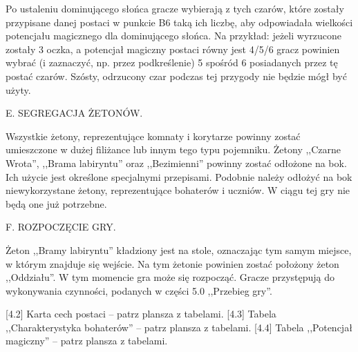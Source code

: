 Po ustaleniu dominującego słońca gracze wybierają z tych czarów, które zostały przypisane danej postaci w punkcie B6 taką ich liczbę, aby odpowiadała wielkości potencjału magicznego dla dominującego słońca.
Na przykład: jeżeli wyrzucone zostały 3 oczka, a potencjał magiczny postaci równy jest 4/5/6 gracz powinien wybrać (i zaznaczyć, np. przez podkreślenie) 5 spośród 6 posiadanych przez tę postać czarów.
Szósty, odrzucony czar podczas tej przygody nie będzie mógł być użyty.

E. SEGREGACJA ŻETONÓW.

Wszystkie żetony, reprezentujące komnaty i korytarze powinny zostać umieszczone w dużej filiżance lub innym tego typu pojemniku.
Żetony ,,Czarne Wrota'', ,,Brama labiryntu'' oraz ,,Bezimienni'' powinny zostać odłożone na bok.
Ich użycie jest określone specjalnymi przepisami.
Podobnie należy odłożyć na bok niewykorzystane żetony, reprezentujące bohaterów i uczniów.
W ciągu tej gry nie będą one już potrzebne.

F. ROZPOCZĘCIE GRY.

Żeton ,,Bramy labiryntu'' kładziony jest na stole, oznaczając tym samym miejsce, w którym znajduje się wejście.
Na tym żetonie powinien zostać położony żeton ,,Oddziału''.
W tym momencie gra może się rozpocząć.
Gracze przystępują do wykonywania czynności, podanych w części 5.0 ,,Przebieg gry''.

[4.2] Karta cech postaci – patrz plansza z tabelami. [4.3] Tabela ,,Charakterystyka bohaterów'' – patrz plansza z tabelami. [4.4] Tabela ,,Potencjał magiczny'' – patrz plansza z tabelami.